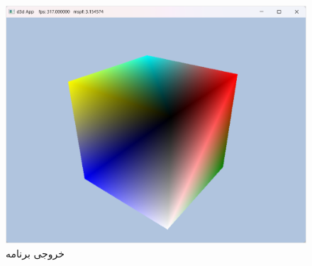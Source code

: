 {\begin{spacing}{1.3}
        \begin{figure}[H]
            \centering
            \setlength{\belowcaptionskip}{-10pt}
            \includegraphics[scale=0.7]{Images/3/3.Intro.5.10}
            \caption{خروجی برنامه}
            \label{fig:3.Intro.5.10}
        \end{figure}
    \end{spacing}
}
\textbf{\vspace{-10pt}}

